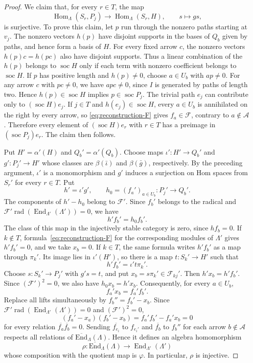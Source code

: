 \documentclass[11pt]{article}
\newcommand{\soc}{\operatorname{soc}}
\newcommand{\rad}{\operatorname{rad}}
\newcommand{\Hom}{\operatorname{Hom}}
\newcommand{\End}{\operatorname{End}}
\newcommand{\isEnd}{\operatorname{\overline{End}}}
\renewcommand{\cal}[1]{\mathcal #1}   %
\providecommand{\varLambda}{\Lambda}
\theoremstyle{definition}
\begin{document}
\begin{proof}
			We claim that, for every $r\in T$, the map
			\[
				\Hom_{\varLambda}(S_r,P_j)\longrightarrow\Hom_{\varLambda}(S_r,H),\qquad s\longmapsto gs,
			\]
			is surjective.
			To prove this claim, let $p$ run through the nonzero paths starting at $v_j$.
			The nonzero vectors $h(p)$ have disjoint supports in the bases of $Q_b$ given by paths, and hence form a basis of $H$.
			For every fixed arrow $c$, the nonzero vectors $h(p)c=h(pc)$ also have disjoint supports.
			Thus a linear combination of the $h(p)$ belongs to $\soc H$ only if each term with nonzero coefficient belongs to $\soc H$.
			If $p$ has positive length and $h(p)\ne0$, choose $a\in U_b$ with $ap\ne0$.
			For any arrow $c$ with $pc\ne0$, we have $apc\ne0$, since $I$ is generated by paths of length two.
			Hence $h(p)\in\soc H$ implies $p\in\soc P_j$.
			The trivial path $e_j$ can contribute only to $(\soc H)e_j$.
			If $j\in T$ and $h(e_j)\in\soc H$, every $a\in U_b$ is annihilated on the right by every arrow, so \eqref{eq:reconstruction-F} gives $f_a\in\cal{F}$, contrary to $a\notin\cal{A}$.
			Therefore every element of $(\soc H)e_r$ with $r\in T$ has a preimage in $(\soc P_j)e_r$.
			The claim then follows.

			Put $H'=\alpha'(H)$ and $Q_b'=\alpha'(Q_b)$.
			Choose maps $\iota':H'\to Q_b'$ and $g':P_j'\to H'$ whose classes are $\beta(\bar\iota)$ and $\beta(\bar g)$, respectively.
			By the preceding argument, $\iota'$ is a monomorphism and $g'$ induces a surjection on Hom spaces from $S_r'$ for every $r\in T$.
			Put
			\[
				h'=\iota'g',\qquad h_0=(f_a')_{a\in U_b}:P_j'\to Q_b'.
			\]
			The components of $h'-h_0$ belong to $\cal{F}'$.
			Since $f_b'$ belongs to the radical and $\cal{F}'\rad(\End_{\varLambda'}(\varLambda'))=0$, we have
			\[
				h'f_b'=h_0f_b'.
			\]
			The class of this map in the injectively stable category is zero, since $hf_b=0$.
			If $k\notin T$, formula~\eqref{eq:reconstruction-F} for the corresponding modules of $\varLambda'$ gives $h'f_b'=0$, and we take $x_b=0$.
			If $k\in T$, the same formula writes $h'f_b'$ as a map through $\pi_k'$.
			Its image lies in $\iota'(H')$, so there is a map $t:S_k'\to H'$ such that
			\[
				h'f_b'=\iota't\pi_k'.
			\]
			Choose $s:S_k'\to P_j'$ with $g's=t$, and put $x_b=s\pi_k'\in\cal{F}_{kj}'$.
			Then $h'x_b=h'f_b'$.
			Since $(\cal{F}')^2=0$, we also have $h_0x_b=h'x_b$.
			Consequently, for every $a\in U_b$,
			\[
				f_a'x_b=f_a'f_b'.
			\]
			Replace all lifts simultaneously by $f_b''=f_b'-x_b$.
			Since $\cal{F}'\rad(\End_{\varLambda'}(\varLambda'))=0$ and $(\cal{F}')^2=0$,
			\[
				(f_a'-x_a)(f_b'-x_b)=f_a'f_b'-f_a'x_b=0
			\]
			for every relation $\overline{f_a}\overline{f_b}=0$.
			Sending $\overline{f_{e_i}}$ to $f_{e_i'}$ and $\overline{f_b}$ to $f_b''$ for each arrow $b\notin\cal{A}$ respects all relations of $\isEnd_{\varLambda}(\varLambda)$.
			Hence it defines an algebra homomorphism
			\[
				\rho\colon\isEnd_{\varLambda}(\varLambda)
				\longrightarrow\End_{\varLambda'}(\varLambda')
			\]
			whose composition with the quotient map is $\varphi$.
			In particular, $\rho$ is injective.


\end{proof}
\end{document}
